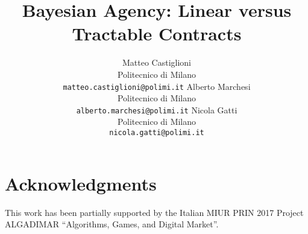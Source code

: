 \documentclass{article}
\title{Bayesian Agency: Linear versus Tractable Contracts}
\author{
	Matteo Castiglioni\\
	Politecnico di Milano\\
	\texttt{matteo.castiglioni@polimi.it}
	\And
	Alberto Marchesi\\
	Politecnico di Milano\\
	\texttt{alberto.marchesi@polimi.it}
	\And
	Nicola Gatti\\
	Politecnico di Milano\\
	\texttt{nicola.gatti@polimi.it}
}
\begin{document}

\maketitle
















\section*{Acknowledgments}
%	
This work has been partially supported by the Italian MIUR PRIN 2017 Project ALGADIMAR ``Algorithms, Games, and Digital Market''.
	





\appendix

\end{document}
